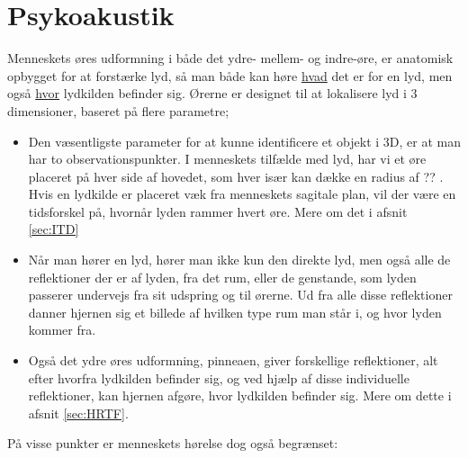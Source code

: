 \chapter{Psykoakustik}

Menneskets øres udformning i både det ydre- mellem- og indre-øre, er anatomisk opbygget for at forstærke lyd, så man både kan høre \underline{hvad} det er for en lyd, men også \underline{hvor} lydkilden befinder sig. Ørerne er designet til at lokalisere lyd i 3 dimensioner, baseret på flere parametre;

\begin{itemize}
	\item  Den væsentligste parameter for at kunne identificere et objekt i 3D, er at man har to observationspunkter. I menneskets tilfælde med lyd, har vi et øre placeret på hver side af hovedet, som hver især kan dække en radius af ?? . Hvis en lydkilde er placeret væk fra menneskets sagitale plan, vil der være en tidsforskel på, hvornår lyden rammer hvert øre. Mere om det i afsnit \ref{sec:ITD}

\item  Når man hører en lyd, hører man ikke kun den direkte lyd, men også alle de reflektioner der er af lyden, fra det rum, eller de genstande, som lyden passerer undervejs fra sit udspring og til ørerne. Ud fra alle disse reflektioner danner hjernen sig et billede af hvilken type rum man står i, og hvor lyden kommer fra. 

\item  Også det ydre øres udformning, pinneaen, giver forskellige reflektioner, alt efter hvorfra lydkilden befinder sig, og ved hjælp af disse individuelle reflektioner, kan hjernen afgøre, hvor lydkilden befinder sig. Mere om dette i afsnit \ref{sec:HRTF}.


\end{itemize}

På visse punkter er menneskets hørelse dog også begrænset:

